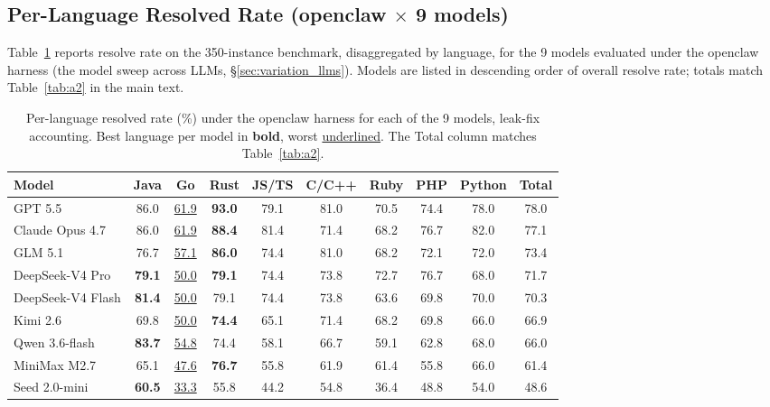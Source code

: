 \documentclass{llmxive}
\begin{document}
\subsection{Per-Language Resolved Rate (openclaw \texorpdfstring{$\times$}{...} 9 models)}
\label{appendix:per-repo:g1}

Table~\ref{tab:appG-per-lang-A} reports resolve rate on the 350-instance benchmark,
disaggregated by language, for the 9 models evaluated under the openclaw harness
(the model sweep across LLMs, \S\ref{sec:variation_llms}). Models are listed in
descending order of overall resolve rate; totals match Table~\ref{tab:a2} in the
main text.

\begin{table}[!htbp]
\centering
\small
\begin{tabular}{lcccccccc|c}
\toprule
Model & Java & Go & Rust & JS/TS & C/C++ & Ruby & PHP & Python & Total \\
\midrule
GPT 5.5           & 86.0          & \underline{61.9} & \textbf{93.0} & 79.1          & 81.0          & 70.5 & 74.4 & 78.0 & 78.0 \\
Claude Opus 4.7   & 86.0          & \underline{61.9} & \textbf{88.4} & 81.4          & 71.4          & 68.2 & 76.7 & 82.0 & 77.1 \\
GLM 5.1           & 76.7          & \underline{57.1} & \textbf{86.0} & 74.4          & 81.0          & 68.2 & 72.1 & 72.0 & 73.4 \\
DeepSeek-V4 Pro   & \textbf{79.1} & \underline{50.0} & \textbf{79.1} & 74.4          & 73.8          & 72.7 & 76.7 & 68.0 & 71.7 \\
DeepSeek-V4 Flash & \textbf{81.4} & \underline{50.0} & 79.1          & 74.4          & 73.8          & 63.6 & 69.8 & 70.0 & 70.3 \\
Kimi 2.6          & 69.8          & \underline{50.0} & \textbf{74.4} & 65.1          & 71.4          & 68.2 & 69.8 & 66.0 & 66.9 \\
Qwen 3.6-flash    & \textbf{83.7} & \underline{54.8} & 74.4          & 58.1          & 66.7          & 59.1 & 62.8 & 68.0 & 66.0 \\
MiniMax M2.7      & 65.1          & \underline{47.6} & \textbf{76.7} & 55.8          & 61.9          & 61.4 & 55.8 & 66.0 & 61.4 \\
Seed 2.0-mini     & \textbf{60.5} & \underline{33.3} & 55.8          & 44.2          & 54.8          & 36.4 & 48.8 & 54.0 & 48.6 \\
\bottomrule
\end{tabular}
\caption{Per-language resolved rate (\%) under the openclaw harness for each of
the 9 models, leak-fix accounting. Best language per model in \textbf{bold},
worst \underline{underlined}. The Total column matches Table~\ref{tab:a2}.}
\label{tab:appG-per-lang-A}
\end{table}
\end{document}
